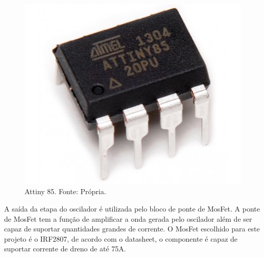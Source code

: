                 \begin{figure}[!htb]
            		\centering
            		\includegraphics[scale= 0.2]{figuras/Attiny.jpg}
            		\caption{Attiny 85. Fonte: Própria.}
            		\label{attiny}
            	\end{figure} 	
            	
            	A saída da etapa do oscilador é utilizada pelo bloco de ponte de MosFet. A 						ponte de MosFet tem a função de amplificar a onda gerada pelo oscilador além 					de ser capaz de suportar quantidades grandes de corrente. O MosFet escolhido 					para este projeto é o IRF2807, de acordo com o datasheet, o componente é capaz 				de suportar corrente de dreno de até 75A.	
            	
